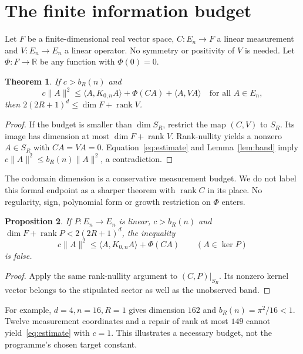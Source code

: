 \documentclass[11pt]{article}
\newtheorem{theorem}{Theorem}[section]
\newtheorem{proposition}[theorem]{Proposition}
\newcommand{\R}{\mathbb R}
\newcommand{\rank}{\operatorname{rank}}
\newcommand{\ip}[2]{\langle #1,#2\rangle}
\begin{document}
\section{The finite information budget}
Let $F$ be a finite-dimensional real vector space, $C:E_n\to F$ a linear
measurement and $V:E_n\to E_n$ a linear operator. No symmetry or positivity
of $V$ is needed. Let $\Phi:F\to\R$ be any function with $\Phi(0)=0$.
\begin{theorem}\label{thm:budget}
If $c>b_R(n)$ and
\begin{equation}\label{eq:estimate}
 c\|A\|^2\leq\ip{A}{K_{0,n}A}+\Phi(CA)+\ip{A}{VA}
 \quad\text{for all }A\in E_n,
\end{equation}
then $2(2R+1)^d\leq\dim F+\rank V$.
\end{theorem}
\begin{proof}
If the budget is smaller than $\dim S_R$, restrict the map $(C,V)$ to $S_R$.
Its image has dimension at most $\dim F+\rank V$. Rank-nullity yields a
nonzero $A\in S_R$ with $CA=VA=0$. Equation~\eqref{eq:estimate} and
Lemma~\ref{lem:band} imply $c\|A\|^2\leq b_R(n)\|A\|^2$, a contradiction.
\end{proof}
The codomain dimension is a conservative measurement budget. We do not label
this formal endpoint as a sharper theorem with $\rank C$ in its place.
No regularity, sign, polynomial form or growth restriction on $\Phi$ enters.

\begin{proposition}\label{prop:sector}
If $P:E_n\to E_n$ is linear, $c>b_R(n)$ and
$\dim F+\rank P<2(2R+1)^d$, the inequality
\[
 c\|A\|^2\leq\ip{A}{K_{0,n}A}+\Phi(CA)
 \qquad(A\in\ker P)
\]
is false.
\end{proposition}
\begin{proof}
Apply the same rank-nullity argument to $(C,P)|_{S_R}$. Its nonzero kernel
vector belongs to the stipulated sector as well as the unobserved band.
\end{proof}
For example, $d=4,n=16,R=1$ gives dimension $162$ and
$b_R(n)=\pi^2/16<1$. Twelve measurement coordinates and a repair of rank at
most $149$ cannot yield~\eqref{eq:estimate} with $c=1$. This illustrates a
necessary budget, not the programme's chosen target constant.
\end{document}
